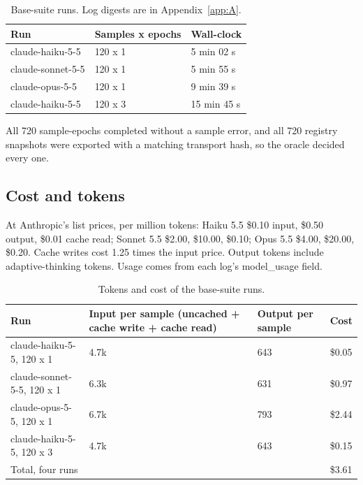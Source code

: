 \documentclass[11pt]{article}
\begin{document}
\begin{table}[!htb]
\caption{Base-suite runs. Log digests are in Appendix~\ref{app:A}.}\label{tab:3}
\small
\begin{tabularx}{\linewidth}{@{}YYl@{}}
\toprule
\textbf{Run} & \textbf{Samples x epochs} & \textbf{Wall-clock} \\ \midrule
claude-haiku-5-5 & 120 x 1 & 5 min 02 s \\
claude-sonnet-5-5 & 120 x 1 & 5 min 55 s \\
claude-opus-5-5 & 120 x 1 & 9 min 39 s \\
claude-haiku-5-5 & 120 x 3 & 15 min 45 s \\
\bottomrule
\end{tabularx}
\end{table}

All 720 sample-epochs completed without a sample error, and all 720 registry snapshots were exported with a matching transport hash, so the oracle decided every one.

\subsection{Cost and tokens}\label{sec:6.2}
At Anthropic's list prices, per million tokens: Haiku 5.5 \$0.10 input, \$0.50 output, \$0.01 cache read; Sonnet 5.5 \$2.00, \$10.00, \$0.10; Opus 5.5 \$4.00, \$20.00, \$0.20. Cache writes cost 1.25 times the input price. Output tokens include adaptive-thinking tokens. Usage comes from each log's model\_usage field.

\begin{table}[!htb]
\caption{Tokens and cost of the base-suite runs.}\label{tab:4}
\small
\begin{tabularx}{\linewidth}{@{}YYYl@{}}
\toprule
\textbf{Run} & \textbf{Input per sample (uncached + cache write + cache read)} & \textbf{Output per sample} & \textbf{Cost} \\ \midrule
claude-haiku-5-5, 120 x 1 & 4.7k & 643 & \$0.05 \\
claude-sonnet-5-5, 120 x 1 & 6.3k & 631 & \$0.97 \\
claude-opus-5-5, 120 x 1 & 6.7k & 793 & \$2.44 \\
claude-haiku-5-5, 120 x 3 & 4.7k & 643 & \$0.15 \\
Total, four runs &  &  & \$3.61 \\
\bottomrule
\end{tabularx}
\end{table}
\end{document}
